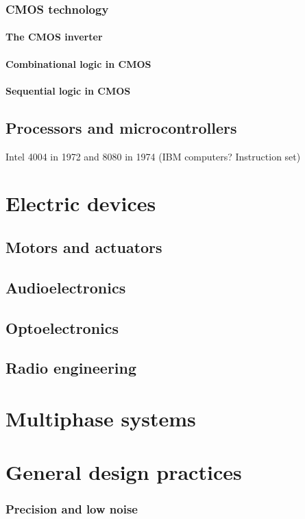 \documentclass{report}
\begin{document}
\section{CMOS technology}
\subsection{The CMOS inverter}
\subsection{Combinational logic in CMOS}
\subsection{Sequential logic in CMOS}

\chapter{Processors and microcontrollers}
Intel 4004 in 1972 and 8080 in 1974 (IBM computers? Instruction set)

\part{Electric devices}
\chapter{Motors and actuators}
\chapter{Audioelectronics}
\chapter{Optoelectronics}
\chapter{Radio engineering}

\part{Multiphase systems}


\part{General design practices}
\section{Precision and low noise}
\end{document}
